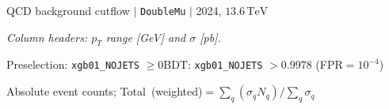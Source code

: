 \documentclass[10pt,a4paper]{article}
\begin{document}
\begin{landscape}

{\large QCD background cutflow $|$ \texttt{DoubleMu} $|$ 2024, $13.6\,\mathrm{TeV}$}

\vspace{0.8em}

\textit{Column headers: $p_T$ range [GeV] and $\sigma$ [pb].}

Preselection: \texttt{xgb01\_NOJETS} $\geq 0$\quad BDT: \texttt{xgb01\_NOJETS} $>0.9978$ (FPR$=10^{-4}$)

\vspace{0.8em}

\vspace{18pt}

Absolute event counts; Total\ (weighted)$=\sum_q(\sigma_q N_q)/\sum_q\sigma_q$


\end{landscape}
\end{document}

